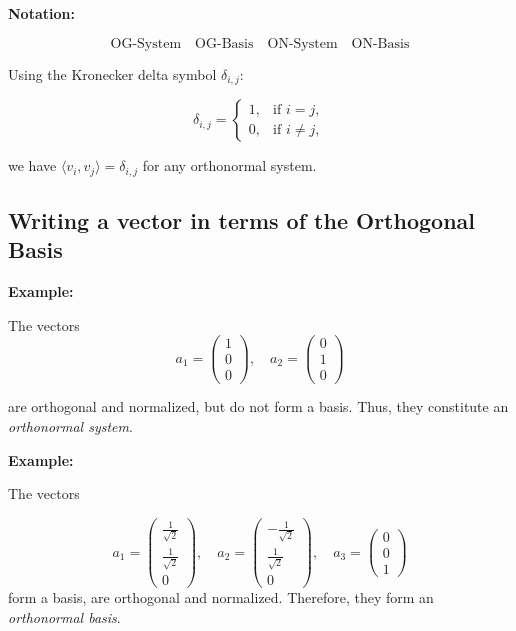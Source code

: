 \textbf{Notation:}

\[
    \text{OG-System} \quad \text{OG-Basis} \quad \text{ON-System} \quad \text{ON-Basis}
\]

Using the Kronecker delta symbol \( \delta_{i,j} \):

\[
    \delta_{i,j} =
    \begin{cases}
    1, & \text{if } i = j, \\
    0, & \text{if } i \neq j,
    \end{cases}
\]

we have \( \langle v_i, v_j \rangle = \delta_{i,j} \) for any orthonormal system.

\subsection{Writing a vector in terms of the Orthogonal Basis}

\textbf{Example:}

The vectors
\[
    a_1 =
    \begin{pmatrix}
    1 \\
    0 \\
    0
    \end{pmatrix}, \quad
    a_2 =
    \begin{pmatrix}
    0 \\
    1 \\
    0
    \end{pmatrix}
\]

are orthogonal and normalized, but do not form a basis. Thus, they constitute an 
\emph{orthonormal system}.

\textbf{Example:}

The vectors

\[
    a_1 =
    \begin{pmatrix}
    \frac{1}{\sqrt{2}} \\
    \frac{1}{\sqrt{2}} \\
    0
    \end{pmatrix}, \quad
    a_2 =
    \begin{pmatrix}
    -\frac{1}{\sqrt{2}} \\
    \frac{1}{\sqrt{2}} \\
    0
    \end{pmatrix}, \quad
    a_3 =
    \begin{pmatrix}
    0 \\
    0 \\
    1
    \end{pmatrix}
\]
form a basis, are orthogonal and normalized. Therefore, they form an \emph{orthonormal basis}.

